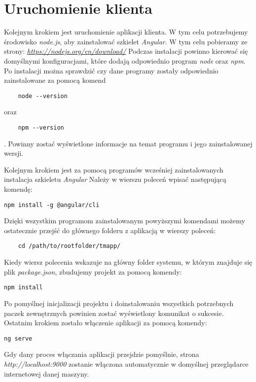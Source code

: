\section{Uruchomienie klienta}
Kolejnym krokiem jest uruchomienie aplikacji klienta.
W tym celu potrzebujemy środowisko \textit{node.js}, aby zainstalować szkielet \textit{Angular}. W tym celu pobieramy ze strony: \textit{\url{https://nodejs.org/en/download/}} 
Podczas instalacji powinno kierować się domyślnymi konfiguracjami, które dodają odpowiednio program \textit{node} oraz \textit{npm}. Po instalacji można sprawdzić czy dane programy zostały odpowiednio zainstalowane za pomocą komend
 \begin{lstlisting}
	node --version
\end{lstlisting}
oraz
\begin{lstlisting}
	npm --version
\end{lstlisting}. Powinny zostać wyświetlone informacje na temat programu i jego zainstalowanej wersji. 

Kolejnym krokiem jest za pomocą programów wcześniej zainstalowanych instalacja szkieletu \textit{Angular}
Należy w wierszu poleceń wpisać następującą komendę:
\begin{lstlisting}
npm install -g @angular/cli
\end{lstlisting}
Dzięki wszystkim programom zainstalowanym powyższymi komendami możemy ostatecznie przejść do głównego folderu z aplikacją w wierszy poleceń: \begin{lstlisting}
	cd /path/to/rootfolder/tmapp/
\end{lstlisting}
Kiedy wiersz polecenia wskazuje na główny folder systemu, w którym znajduje się plik \textit{package.json}, zbudujemy projekt za pomocą komendy:

\begin{lstlisting}
npm install
\end{lstlisting}

Po pomyślnej inicjalizacji projektu i doinstalowaniu wszystkich potrzebnych paczek zewnętrznych powinien zostać wyświetlony komunikat o sukcesie.
Ostatnim krokiem zostało włączenie aplikacji za pomocą komendy:
\begin{lstlisting}
ng serve
\end{lstlisting}
Gdy dany proces włączania aplikacji przejdzie pomyślnie, strona \textit{http://localhost:9000} zostanie włączona automatycznie w domyślnej przeglądarce internetowej danej maszyny.





